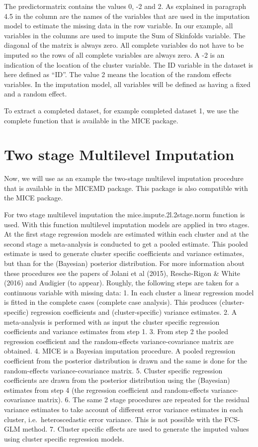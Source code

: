 \documentclass[]{book}
\theoremstyle{definition}
\theoremstyle{definition}
\theoremstyle{definition}
\theoremstyle{remark}
\begin{document}
The predictormatrix contains the values 0, -2 and 2. As explained in
paragraph 4.5 in the column are the names of the variables that are used
in the imputation model to estimate the missing data in the row
variable. In our example, all variables in the columns are used to
impute the Sum of Skinfolds variable. The diagonal of the matrix is
always zero. All complete variables do not have to be imputed so the
rows of all complete variables are always zero. A -2 is an indication of
the location of the cluster variable. The ID variable in the dataset is
here defined as ``ID''. The value 2 means the location of the random
effects variables. In the imputation model, all variables will be
defined as having a fixed and a random effect.

To extract a completed dataset, for example completed dataset 1, we use
the complete function that is available in the MICE package.

\section{Two stage Multilevel
Imputation}\label{two-stage-multilevel-imputation}

Now, we will use as an example the two-stage multilevel imputation
procedure that is available in the MICEMD package. This package is also
compatible with the MICE package.

For two stage multilevel imputation the mice.impute.2l.2stage.norm
function is used. With this function multilevel imputation models are
applied in two stages. At the first stage regression models are
estimated within each cluster and at the second stage a meta-analysis is
conducted to get a pooled estimate. This pooled estimate is used to
generate cluster specific coefficients and variance estimates, but than
for the (Bayesian) posterior distribution. For more information about
these procedures see the papers of Jolani et al (2015), Resche-Rigon \&
White (2016) and Audigier (to appear). Roughly, the following steps are
taken for a continuous variable with missing data: 1. In each cluster a
linear regression model is fitted in the complete cases (complete case
analysis). This produces (cluster-specific) regression coefficients and
(cluster-specific) variance estimates. 2. A meta-analysis is performed
with as input the cluster specific regression coefficients and variance
estimates from step 1. 3. From step 2 the pooled regression coefficient
and the random-effects variance-covariance matrix are obtained. 4. MICE
is a Bayesian imputation procedure. A pooled regression coefficient from
the posterior distribution is drawn and the same is done for the
random-effects variance-covariance matrix. 5. Cluster specific
regression coefficients are drawn from the posterior distribution using
the (Bayesian) estimates from step 4 (the regression coefficient and
random-effects variance-covariance matrix). 6. The same 2 stage
procedures are repeated for the residual variance estimates to take
account of different error variance estimates in each cluster,
i.e.~heteroscedastic error variance. This is not possible with the
FCS-GLM method. 7. Cluster specific effects are used to generate the
imputed values using cluster specific regression models.
\end{document}
